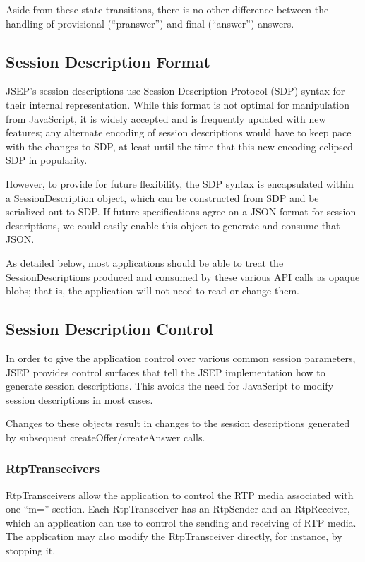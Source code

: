 \documentclass{article}
\begin{document}
Aside from these state transitions, there is no other difference
between the handling of provisional (``pranswer'') and final (``answer'')
answers.

\subsection{Session Description Format}

JSEP's session descriptions use Session Description Protocol (SDP)
syntax for their internal representation.  While this format is not
optimal for manipulation from JavaScript, it is widely accepted and
is frequently updated with new features; any alternate encoding of
session descriptions would have to keep pace with the changes to SDP,
at least until the time that this new encoding eclipsed SDP in
popularity.

However, to provide for future flexibility, the SDP syntax is
encapsulated within a SessionDescription object, which can be
constructed from SDP and be serialized out to SDP.  If future
specifications agree on a JSON format for session descriptions, we
could easily enable this object to generate and consume that JSON.

As detailed below, most applications should be able to treat the
SessionDescriptions produced and consumed by these various API calls
as opaque blobs; that is, the application will not need to read or
change them.

\subsection{Session Description Control}

In order to give the application control over various common session
parameters, JSEP provides control surfaces that tell the JSEP
implementation how to generate session descriptions.  This avoids the
need for JavaScript to modify session descriptions in most cases.

Changes to these objects result in changes to the session
descriptions generated by subsequent createOffer/createAnswer calls.

\subsubsection{RtpTransceivers}

RtpTransceivers allow the application to control the RTP media
associated with one ``m='' section.  Each RtpTransceiver has an
RtpSender and an RtpReceiver, which an application can use to control
the sending and receiving of RTP media.  The application may also
modify the RtpTransceiver directly, for instance, by stopping it.
\end{document}
